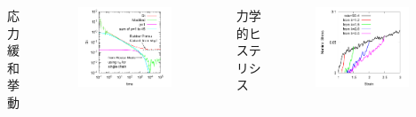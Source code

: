 \documentclass[11pt, dvipdfmx]{beamer}
\begin{document}
\begin{frame}
\begin{columns}[totalwidth=1\textwidth]
\scriptsize
応力緩和挙動
\vspace{-5mm}
\begin{figure}
\centering
\includegraphics[width=0.9\textwidth]{./fig/Gt_loglog.pdf}
\end{figure}
\scriptsize
力学的ヒステリシス
\vspace{-5mm}
\begin{figure}
\centering
\includegraphics[width=0.9\textwidth]{./fig/N44_rev_SS.pdf}
\end{figure}
\end{columns}
\end{frame}
\end{document}
